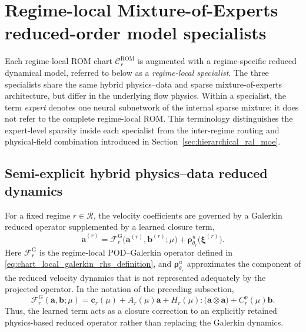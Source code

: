 \section{Regime-local Mixture-of-Experts reduced-order model specialists}
\label{sec:hprs_specialists}





Each regime-local ROM chart $\mathcal{C}^{\mathrm{ROM}}_r$ is augmented with a
regime-specific reduced dynamical model, referred to below as a
\emph{regime-local specialist}.  The three specialists share the same hybrid
physics--data and sparse mixture-of-experts architecture, 
but differ in the underlying flow physics.  Within a specialist, the term
\emph{expert} denotes one neural subnetwork of the internal sparse mixture;
it does not refer to the complete regime-local ROM.  This terminology
distinguishes the expert-level sparsity inside each specialist from the
inter-regime routing and physical-field combination introduced in
Section~\ref{sec:hierarchical_ral_moe}.

\subsection{Semi-explicit hybrid physics--data reduced dynamics}
\label{subsec:semi_explicit_hybrid_dynamics}

For a fixed regime $r\in\mathcal{R}$, the velocity coefficients are governed
by a Galerkin reduced operator supplemented by a learned closure term,
\begin{equation}
  \dot{\boldsymbol{a}}^{(r)}
  =
  \mathscr{F}^{\mathrm{G}}_r
  \bigl(
    \boldsymbol{a}^{(r)},
    \boldsymbol{b}^{(r)};
    \mu
  \bigr)
  +
  \boldsymbol{\rho}^{u}_{\theta_r}
  \bigl(
    \boldsymbol{\xi}^{(r)}
  \bigr).
  \label{eq:hybrid_velocity_rhs}
\end{equation}
Here $\mathscr{F}^{\mathrm{G}}_r$ is the regime-local POD--Galerkin operator
defined in \eqref{eq:chart_local_galerkin_rhs_definition}, and
$\boldsymbol{\rho}^{u}_{\theta_r}$ approximates the component of the reduced
velocity dynamics that is not represented adequately by the projected
operator.  In the notation of the preceding subsection,
\begin{equation}
  \mathscr{F}^{\mathrm{G}}_r
  (\boldsymbol{a},\boldsymbol{b};\mu)
  =
  \boldsymbol{c}_{r}(\mu)
  +A_{r}(\mu)\boldsymbol{a}
  +H_{r}(\mu):
   \bigl(\boldsymbol{a}\otimes\boldsymbol{a}\bigr)
  +C_{r}^{p}(\mu)\boldsymbol{b}.
  \label{eq:galerkin_rhs}
\end{equation}
Thus, the learned term acts as a closure correction to an explicitly retained
physics-based reduced operator rather than replacing the Galerkin dynamics.


